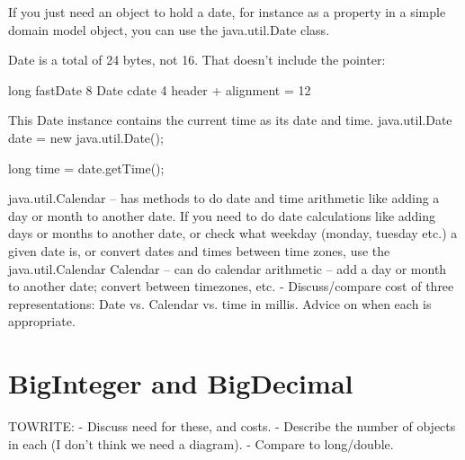 If you just need an object to hold a date, for instance as a property in a
simple domain model object, you can use the java.util.Date class.

Date is a total of 24 bytes, not 16.  That doesn't include the pointer:

long fastDate    8
Date cdate  4
header + alignment = 12 

This Date instance contains the current time as its date and time.
java.util.Date date = new java.util.Date();

long time = date.getTime(); 

java.util.Calendar -- has methods to do date and time arithmetic like adding a
day or
month to another date.
If you need to do date calculations like adding days or months to another date,
or check what weekday (monday, tuesday etc.) a given date is, or convert dates and times between time zones, use the java.util.Calendar Calendar -- can do calendar arithmetic -- add a day or
month to another date; convert between timezones, etc. - Discuss/compare cost of three representations:
Date vs. Calendar vs. time in millis.  Advice on when each is appropriate.

\section{BigInteger and BigDecimal}
TOWRITE:
- Discuss need for these, and costs.  - Describe the number of objects in each
(I don't think we need a diagram). - Compare to long/double.
